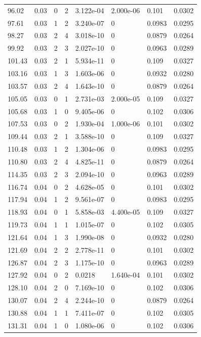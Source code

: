 \documentclass[preview]{standalone}
\begin{document}
{{{\begin{tabular}{L{1.2cm}C{1.2cm} C{0.3cm}C{0.5cm} C{1.4cm}C{1.4cm} C{1.4cm}C{1.4cm}}
  96.02  &  0.03  & 0     &  2 &  3.122e-04  & 2.000e-06  & 0.101 &  0.0302   \\ 
  97.61  &  0.03  & 1     &  2 &  3.240e-07  & 0  & 0.0983 &  0.0295   \\ 
  98.27  &  0.03  & 2     &  4 &  3.018e-10  & 0  & 0.0879 &  0.0264   \\ 
  99.92  &  0.03  & 2     &  3 &  2.027e-10  & 0  & 0.0963 &  0.0289   \\ 
  101.43  &  0.03  & 2     &  1 &  5.934e-11  & 0  & 0.109 &  0.0327   \\ 
  103.16  &  0.03  & 1     &  3 &  1.603e-06  & 0  & 0.0932 &  0.0280   \\ 
  103.57  &  0.03  & 2     &  4 &  1.643e-10  & 0  & 0.0879 &  0.0264   \\ 
  105.05  &  0.03  & 0     &  1 &  2.731e-03  & 2.000e-05  & 0.109 &  0.0327   \\ 
  105.68  &  0.03  & 1     &  0 &  9.405e-06  & 0  & 0.102 &  0.0306   \\ 
  107.53  &  0.03  & 0     &  2 &  1.930e-04  & 1.000e-06  & 0.101 &  0.0302   \\ 
  109.44  &  0.03  & 2     &  1 &  3.588e-10  & 0  & 0.109 &  0.0327   \\ 
  110.48  &  0.03  & 1     &  2 &  1.304e-06  & 0  & 0.0983 &  0.0295   \\ 
  110.80  &  0.03  & 2     &  4 &  4.825e-11  & 0  & 0.0879 &  0.0264   \\ 
  114.35  &  0.03  & 2     &  3 &  2.094e-10  & 0  & 0.0963 &  0.0289   \\ 
  116.74  &  0.04  & 0     &  2 &  4.628e-05  & 0  & 0.101 &  0.0302   \\ 
  117.94  &  0.04  & 1     &  2 &  9.561e-07  & 0  & 0.0983 &  0.0295   \\ 
  118.93  &  0.04  & 0     &  1 &  5.858e-03  & 4.400e-05  & 0.109 &  0.0327   \\ 
  119.73  &  0.04  & 1     &  1 &  1.015e-07  & 0  & 0.102 &  0.0305   \\ 
  121.64  &  0.04  & 1     &  3 &  1.990e-08  & 0  & 0.0932 &  0.0280   \\ 
  121.69  &  0.04  & 2     &  2 &  2.778e-11  & 0  & 0.101 &  0.0302   \\ 
  126.87  &  0.04  & 2     &  3 &  1.175e-10  & 0  & 0.0963 &  0.0289   \\ 
  127.92  &  0.04  & 0     &  2 &  0.0218  & 1.640e-04  & 0.101 &  0.0302   \\ 
  128.10  &  0.04  & 2     &  0 &  7.169e-10  & 0  & 0.102 &  0.0306   \\ 
  130.07  &  0.04  & 2     &  4 &  2.244e-10  & 0  & 0.0879 &  0.0264   \\ 
  130.88  &  0.04  & 1     &  1 &  7.411e-07  & 0  & 0.102 &  0.0305   \\ 
  131.31  &  0.04  & 1     &  0 &  1.080e-06  & 0  & 0.102 &  0.0306   \\ 
\hline 
\end{tabular} 

}}}
\end{document}
